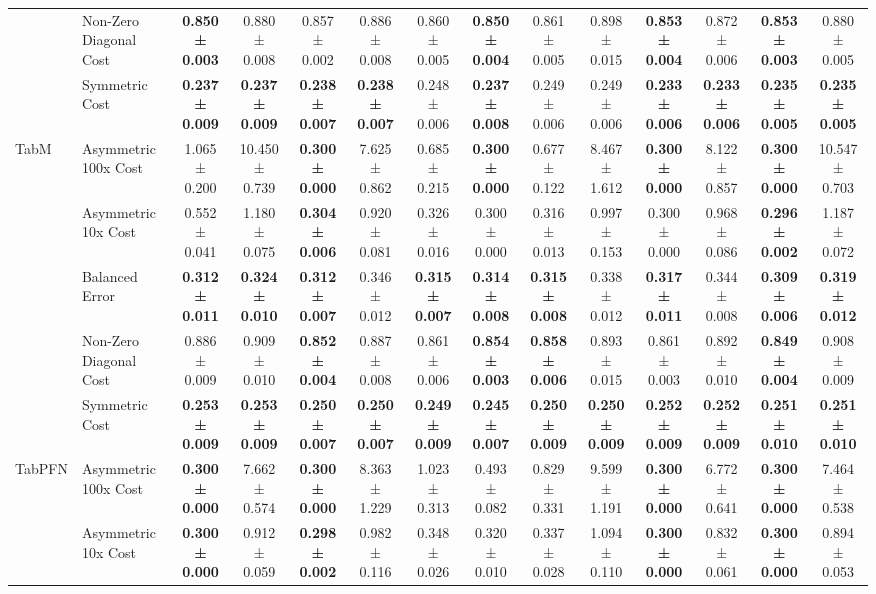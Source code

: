 \begin{table}[H]
{\begin{tabular}{llcccccccccccc}
 & Non-Zero Diagonal Cost & \textbf{0.850 ± 0.003} & 0.880 ± 0.008 & 0.857 ± 0.002 & 0.886 ± 0.008 & 0.860 ± 0.005 & \textbf{0.850 ± 0.004} & 0.861 ± 0.005 & 0.898 ± 0.015 & \textbf{0.853 ± 0.004} & 0.872 ± 0.006 & \textbf{0.853 ± 0.003} & 0.880 ± 0.005 \\
 & Symmetric Cost & \textbf{0.237 ± 0.009} & \textbf{0.237 ± 0.009} & \textbf{0.238 ± 0.007} & \textbf{0.238 ± 0.007} & 0.248 ± 0.006 & \textbf{0.237 ± 0.008} & 0.249 ± 0.006 & 0.249 ± 0.006 & \textbf{0.233 ± 0.006} & \textbf{0.233 ± 0.006} & \textbf{0.235 ± 0.005} & \textbf{0.235 ± 0.005} \\
\cline{1-14}
\multirow[t]{5}{*}{TabM} & Asymmetric 100x Cost & 1.065 ± 0.200 & 10.450 ± 0.739 & \textbf{0.300 ± 0.000} & 7.625 ± 0.862 & 0.685 ± 0.215 & \textbf{0.300 ± 0.000} & 0.677 ± 0.122 & 8.467 ± 1.612 & \textbf{0.300 ± 0.000} & 8.122 ± 0.857 & \textbf{0.300 ± 0.000} & 10.547 ± 0.703 \\
 & Asymmetric 10x Cost & 0.552 ± 0.041 & 1.180 ± 0.075 & \textbf{0.304 ± 0.006} & 0.920 ± 0.081 & 0.326 ± 0.016 & 0.300 ± 0.000 & 0.316 ± 0.013 & 0.997 ± 0.153 & 0.300 ± 0.000 & 0.968 ± 0.086 & \textbf{0.296 ± 0.002} & 1.187 ± 0.072 \\
 & Balanced Error & \textbf{0.312 ± 0.011} & \textbf{0.324 ± 0.010} & \textbf{0.312 ± 0.007} & 0.346 ± 0.012 & \textbf{0.315 ± 0.007} & \textbf{0.314 ± 0.008} & \textbf{0.315 ± 0.008} & 0.338 ± 0.012 & \textbf{0.317 ± 0.011} & 0.344 ± 0.008 & \textbf{0.309 ± 0.006} & \textbf{0.319 ± 0.012} \\
 & Non-Zero Diagonal Cost & 0.886 ± 0.009 & 0.909 ± 0.010 & \textbf{0.852 ± 0.004} & 0.887 ± 0.008 & 0.861 ± 0.006 & \textbf{0.854 ± 0.003} & \textbf{0.858 ± 0.006} & 0.893 ± 0.015 & 0.861 ± 0.003 & 0.892 ± 0.010 & \textbf{0.849 ± 0.004} & 0.908 ± 0.009 \\
 & Symmetric Cost & \textbf{0.253 ± 0.009} & \textbf{0.253 ± 0.009} & \textbf{0.250 ± 0.007} & \textbf{0.250 ± 0.007} & \textbf{0.249 ± 0.009} & \textbf{0.245 ± 0.007} & \textbf{0.250 ± 0.009} & \textbf{0.250 ± 0.009} & \textbf{0.252 ± 0.009} & \textbf{0.252 ± 0.009} & \textbf{0.251 ± 0.010} & \textbf{0.251 ± 0.010} \\
\cline{1-14}
\multirow[t]{5}{*}{TabPFN} & Asymmetric 100x Cost & \textbf{0.300 ± 0.000} & 7.662 ± 0.574 & \textbf{0.300 ± 0.000} & 8.363 ± 1.229 & 1.023 ± 0.313 & 0.493 ± 0.082 & 0.829 ± 0.331 & 9.599 ± 1.191 & \textbf{0.300 ± 0.000} & 6.772 ± 0.641 & \textbf{0.300 ± 0.000} & 7.464 ± 0.538 \\
 & Asymmetric 10x Cost & \textbf{0.300 ± 0.000} & 0.912 ± 0.059 & \textbf{0.298 ± 0.002} & 0.982 ± 0.116 & 0.348 ± 0.026 & 0.320 ± 0.010 & 0.337 ± 0.028 & 1.094 ± 0.110 & \textbf{0.300 ± 0.000} & 0.832 ± 0.061 & \textbf{0.300 ± 0.000} & 0.894 ± 0.053 \\

\end{tabular}}
\end{table}
